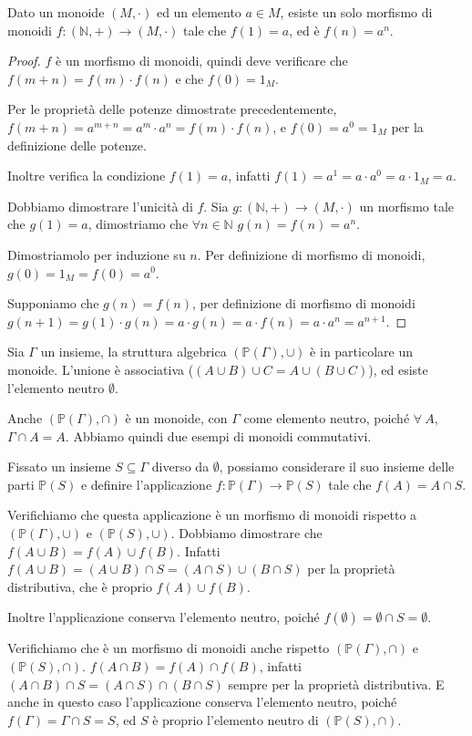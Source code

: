 \begin{theorem}
Dato un monoide $(M, \cdot)$ ed un elemento $a \in M$, esiste un solo morfismo di monoidi $f : (\mathbb{N}, +) \to (M, \cdot)$ tale che $f(1) = a$, ed \`e $f(n) = a^n$.
\end{theorem}
\begin{proof}
$f$ \`e un morfismo di monoidi, quindi deve verificare che $f(m+n) = f(m) \cdot f(n)$ e che $f(0) = 1_M$. 

Per le propriet\`a delle potenze dimostrate precedentemente, $f(m+ n) = a^{m+n} = a^m \cdot a^n = f(m) \cdot f(n)$, e $f(0) = a^0 = 1_M$ per la definizione delle potenze. 

Inoltre verifica la condizione $f(1) = a$, infatti $f(1) = a^1 = a \cdot a^0 = a \cdot 1_M = a$.

Dobbiamo dimostrare l'unicit\`a di $f$. Sia $g : (\mathbb{N}, +) \to (M, \cdot )$ un morfismo tale che $g(1) = a$, dimostriamo che $\forall n \in \mathbb{N} $ $ g(n) = f(n) = a^n$.

Dimostriamolo per induzione su $n$. Per definizione di morfismo di monoidi, $g(0) = 1_M = f(0) = a^0$.

Supponiamo che $g(n) = f(n)$, per definizione di morfismo di monoidi $g(n+1) = g(1) \cdot g(n) = a \cdot g(n) = a \cdot f(n) = a \cdot a^n = a^{n+1}$.
\end{proof}

\begin{exmp}
Sia $\Gamma$ un insieme, la struttura algebrica $(\mathbb{P}(\Gamma), \cup)$ \`e in particolare un monoide. L'unione \`e associativa ($(A \cup B) \cup C = A \cup (B \cup C)$), ed esiste l'elemento neutro $\emptyset$.

Anche $(\mathbb{P}(\Gamma), \cap)$ \`e un monoide, con $\Gamma$ come elemento neutro, poich\'e $\forall \ A$, $\Gamma \cap A = A$. Abbiamo quindi due esempi di monoidi commutativi.

Fissato un insieme $S \subseteq \Gamma$ diverso da $\emptyset$, possiamo considerare il suo insieme delle parti $\mathbb{P}(S)$ e definire l'applicazione $f : \mathbb{P}(\Gamma) \to \mathbb{P}(S)$ tale che $f(A) = A \cap S$. 

Verifichiamo che questa applicazione \`e un morfismo di monoidi rispetto a $(\mathbb{P}(\Gamma), \cup)$ e $(\mathbb{P}(S), \cup)$. Dobbiamo dimostrare che $f( A \cup B) = f(A) \cup f(B)$. Infatti $f(A \cup B) = (A \cup B) \cap S = (A \cap S) \cup (B \cap S)$ per la propriet\`a distributiva, che \`e proprio $f(A) \cup f(B)$.

Inoltre l'applicazione conserva l'elemento neutro, poich\'e $f(\emptyset) = \emptyset \cap S = \emptyset$.

Verifichiamo che \`e un morfismo di monoidi anche rispetto $(\mathbb{P}(\Gamma), \cap)$ e $(\mathbb{P}(S), \cap)$. $f(A \cap B) = f(A) \cap f(B)$, infatti $(A \cap B) \cap S = (A \cap S) \cap (B \cap S)$ sempre per la propriet\`a distributiva. E anche in questo caso l'applicazione conserva l'elemento neutro, poich\'e $f(\Gamma) = \Gamma \cap S = S$, ed $S$ \`e proprio l'elemento neutro di $(\mathbb{P}(S), \cap)$.
\end{exmp}

